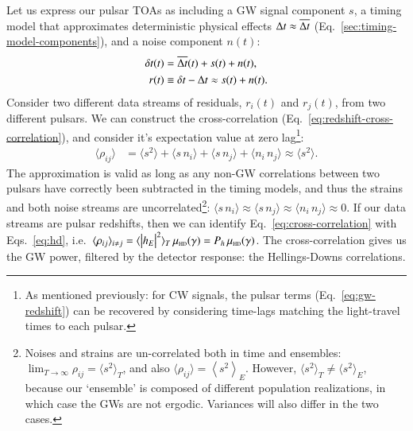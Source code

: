 \documentclass[onecolumn,authoryear]{els-mrw}
\begin{document}
Let us express our pulsar TOAs as including a GW signal component $s$, a timing model that approximates deterministic physical effects ${\Delta{}t} \approx \overline{{\Delta{}t}}$ (Eq.~\ref{sec:timing-model-components}), and a noise component $n(t)$:
\begin{align}\label{eq:toa-components-gw}
    {\delta{}t}(t) & = \overline{{\Delta{}t}}(t) + s(t) + n(t), \\
    r(t) & \equiv {\delta{}t} - {\Delta{}t} \approx s(t) + n(t).
\end{align}
Consider two different data streams of residuals, $r_i(t)$ and $r_j(t)$, from two different pulsars.  We can construct the cross-correlation (Eq.~\ref{eq:redshift-cross-correlation}), and consider it's expectation value at zero lag\footnote{As mentioned previously: for CW signals, the pulsar terms (Eq.~\ref{eq:gw-redshift}) can be recovered by considering time-lags matching the light-travel times to each pulsar.}:
\begin{align}\label{eq:cross-correlation}
    \langle \rho_{ij} \rangle & = \langle s^2 \rangle + \langle s \, n_i \rangle + \langle s \, n_j \rangle + \langle n_i \, n_j \rangle \approx \langle s^2 \rangle.
\end{align}
The approximation is valid as long as any non-GW correlations between two pulsars have correctly been subtracted in the timing models, and thus the strains and both noise streams are uncorrelated\footnote{Noises and strains are un-correlated both in time and ensembles: $\lim_{T \rightarrow \infty} \rho_{ij} = \langle s^2 \rangle_T$, and also \mbox{$\langle \rho_{ij} \rangle = \left< s^2 \right>_E$}.  However, $\langle s^2 \rangle_T \neq \langle s^2 \rangle_E$, because our `ensemble' is composed of different population realizations, in which case the GWs are not ergodic.  Variances will also differ in the two cases.}: \mbox{$\langle s \, n_i \rangle \approx \langle s \, n_j \rangle \approx \langle n_i \, n_j \rangle \approx 0$}.  If our data streams are pulsar redshifts, then we can identify Eq.~\ref{eq:cross-correlation} with Eqs.~\ref{eq:hd}, i.e.~\mbox{$\langle \rho_{ij} \rangle_{i \neq j} = \langle \big| h_E \big|^2 \rangle_T \, \hdfunc(\gamma) = P_h \, \hdfunc(\gamma)$}.  The cross-correlation gives us the GW power, filtered by the detector response: the Hellings-Downs correlations.
\end{document}
